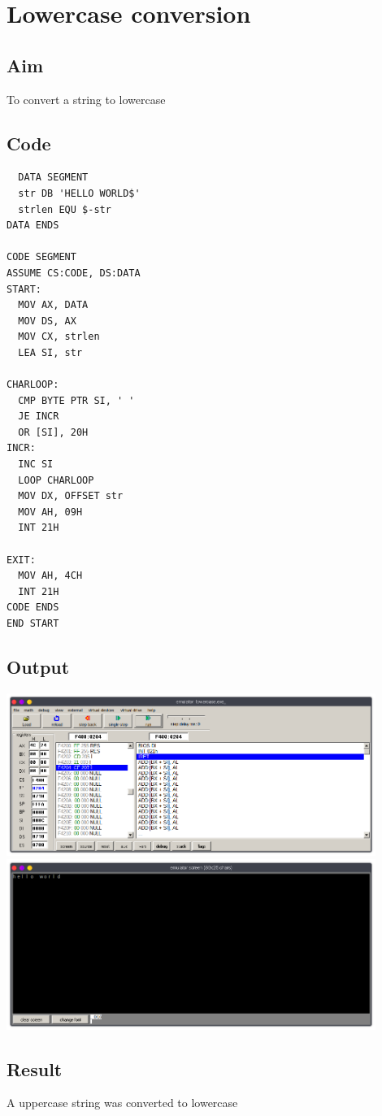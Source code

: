 \section{Lowercase conversion}
\subsection{Aim}
To convert a string to lowercase

\subsection{Code}
\begin{lstlisting}
  DATA SEGMENT
  str DB 'HELLO WORLD$'
  strlen EQU $-str
DATA ENDS

CODE SEGMENT
ASSUME CS:CODE, DS:DATA
START:
  MOV AX, DATA
  MOV DS, AX
  MOV CX, strlen
  LEA SI, str

CHARLOOP:
  CMP BYTE PTR SI, ' '
  JE INCR
  OR [SI], 20H
INCR:
  INC SI
  LOOP CHARLOOP
  MOV DX, OFFSET str
  MOV AH, 09H
  INT 21H 
         
EXIT:
  MOV AH, 4CH
  INT 21H
CODE ENDS
END START
\end{lstlisting}

\subsection{Output}
\begin{center}
	\includegraphics[width=0.90\textwidth]{img/p20/ss1.png}
	\includegraphics[width=0.90\textwidth]{img/p20/ss2.png}
\end{center}

\subsection{Result}
A uppercase string was converted to lowercase

